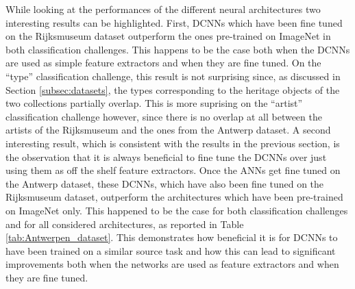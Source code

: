 \documentclass[runningheads]{llncs}
\begin{document}
While looking at the performances of the different neural architectures two interesting results can be highlighted. First, DCNNs which have been fine tuned on the Rijksmuseum dataset outperform the ones pre-trained on ImageNet in both classification challenges. This happens to be the case both when the DCNNs are used as simple feature extractors and when they are fine tuned. On the ``type'' classification challenge, this result is not surprising since, as discussed in Section \ref{subsec:datasets}, the types corresponding to the heritage objects of the two collections partially overlap. This is more suprising on the ``artist'' classification challenge however, since there is no overlap at all between the artists of the Rijksmuseum and the ones from the Antwerp dataset.
A second interesting result, which is consistent with the results in the previous section,  is the observation that it is always beneficial to fine tune the DCNNs over just using them as off the shelf feature extractors. Once the ANNs get fine tuned on the Antwerp dataset, these DCNNs, which have also been fine tuned on the Rijksmuseum dataset, outperform the architectures which have been pre-trained on ImageNet only. This happened to be the case for both classification challenges and for all considered architectures, as reported in Table \ref{tab:Antwerpen_dataset}. This demonstrates how beneficial it is for DCNNs to have been trained on a similar source task and how this can lead to significant improvements both when the networks are used as feature extractors and when they are fine tuned. 
\end{document}
